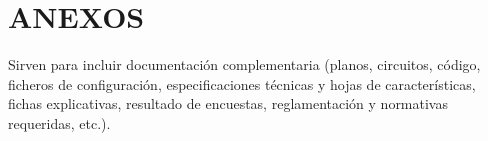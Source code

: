\chapter{ANEXOS}

Sirven para incluir documentación complementaria (planos, circuitos, código, ficheros de configuración, especificaciones técnicas y hojas de características, fichas explicativas, resultado de encuestas, reglamentación y normativas requeridas, etc.).
